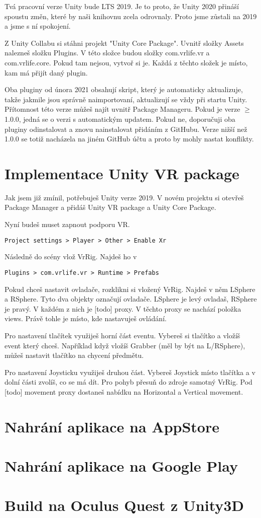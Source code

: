 \documentclass{article}
\begin{document}
Tvá pracovní verze Unity bude LTS 2019. Je to proto, že Unity 2020 přináší spoustu změn, které by naši knihovnu zcela odrovnaly. Proto jsme zůstali na 2019 a jsme s ní spokojení.

Z Unity Collabu si stáhni projekt "Unity Core Package". Uvnitř složky Assets nalezneš složku Plugins. V této složce budou složky com.vrlife.vr a com.vrlife.core. Pokud tam nejsou, vytvoř si je. Každá z těchto složek je místo, kam má přijít daný plugin.

Oba pluginy od února 2021 obsahují skript, který je automaticky aktualizuje, takže jakmile jsou správně naimportovaní, aktualizují se vždy při startu Unity. Přítomnost této verze můžeš najít uvnitř Package Manageru. Pokud je verze $\geq$ 1.0.0, jedná se o verzi s automatickým updatem. Pokud ne, doporučuji oba pluginy odinstalovat a znovu nainstalovat přidáním z GitHubu. Verze nižší než 1.0.0 se totiž nacházela na jiném GitHub účtu a proto by mohly nastat konflikty.
\pagebreak

\section{Implementace Unity VR package}
Jak jsem již zmínil, potřebuješ Unity verze 2019. V novém projektu si otevřeš Package Manager a přidáš Unity VR package a Unity Core Package.

Nyní budeš muset zapnout podporu VR.

\begin{lstlisting}
Project settings > Player > Other > Enable Xr
\end{lstlisting}

Následně do scény vlož VrRig. Najdeš ho v 
\begin{lstlisting}
Plugins > com.vrlife.vr > Runtime > Prefabs
\end{lstlisting}

Pokud chceš nastavit ovladače, rozklikni si vložený VrRig. Najdeš v něm LSphere a RSphere. Tyto dva objekty označují ovladače. LSphere je levý ovladaš, RSphere je pravý. V každém z nich je [todo] proxy. V těchto proxy se nachází položka views. Právě tohle je místo, kde nastavuješ ovládání.

Pro nastavení tlačítek využiješ horní část eventu. Vybereš si tlačítko a vložíš event který chceš. Například když vložíš Grabber (měl by být na L/RSphere), můžeš nastavit tlačítko na chycení předmětu.

Pro nastavení Joysticku využiješ druhou část. Vybereš Joystick místo tlačítka a v dolní části zvolíš, co se má dít. Pro pohyb přesuň do zdroje samotný VrRig. Pod [todo] movement proxy dostaneš nabídku na Horizontal a Vertical movement.

\pagebreak

\section{Nahrání aplikace na AppStore}
\pagebreak

\section{Nahrání aplikace na Google Play}
\pagebreak

\section{Build na Oculus Quest z Unity3D}
\pagebreak
\end{document}
